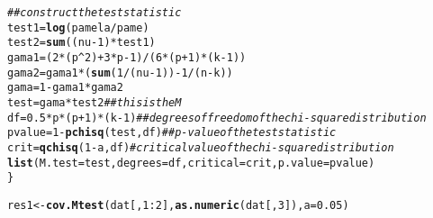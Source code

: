 \documentclass[a4paper,titlepage,12pt]{article}\usepackage[]{graphicx}\usepackage[]{color}
\makeatletter
\newcommand{\hlnum}[1]{\textcolor[rgb]{0.686,0.059,0.569}{#1}}%
\newcommand{\hlcom}[1]{\textcolor[rgb]{0.678,0.584,0.686}{\textit{#1}}}%
\newcommand{\hlopt}[1]{\textcolor[rgb]{0,0,0}{#1}}%
\newcommand{\hlstd}[1]{\textcolor[rgb]{0.345,0.345,0.345}{#1}}%
\newcommand{\hlkwb}[1]{\textcolor[rgb]{0.69,0.353,0.396}{#1}}%
\newcommand{\hlkwc}[1]{\textcolor[rgb]{0.333,0.667,0.333}{#1}}%
\newcommand{\hlkwd}[1]{\textcolor[rgb]{0.737,0.353,0.396}{\textbf{#1}}}%
\newenvironment{kframe}{%
 \def\at@end@of@kframe{}%
 \ifinner\ifhmode%
  \def\at@end@of@kframe{\end{minipage}}%
  \begin{minipage}{\columnwidth}%
 \fi\fi%
 \def\FrameCommand##1{\hskip\@totalleftmargin \hskip-\fboxsep
 \colorbox{shadecolor}{##1}\hskip-\fboxsep
     \hskip-\linewidth \hskip-\@totalleftmargin \hskip\columnwidth}%
 \MakeFramed {\advance\hsize-\width
   \@totalleftmargin\z@ \linewidth\hsize
   \@setminipage}}%
 {\par\unskip\endMakeFramed%
 \at@end@of@kframe}
\newenvironment{knitrout}{}{} %
\makeatother
\begin{document}
\begin{knitrout}
\begin{kframe}
\begin{alltt}
    \hlcom{## construct the test statistic}
    \hlstd{test1} \hlkwb{=} \hlkwd{log}\hlstd{(pamela}\hlopt{/}\hlstd{pame)}
    \hlstd{test2} \hlkwb{=} \hlkwd{sum}\hlstd{((nu} \hlopt{-} \hlnum{1}\hlstd{)} \hlopt{*} \hlstd{test1)}
    \hlstd{gama1} \hlkwb{=} \hlstd{(}\hlnum{2} \hlopt{*} \hlstd{(p}\hlopt{^}\hlnum{2}\hlstd{)} \hlopt{+} \hlnum{3} \hlopt{*} \hlstd{p} \hlopt{-} \hlnum{1}\hlstd{)}\hlopt{/}\hlstd{(}\hlnum{6} \hlopt{*} \hlstd{(p} \hlopt{+} \hlnum{1}\hlstd{)} \hlopt{*} \hlstd{(k} \hlopt{-} \hlnum{1}\hlstd{))}
    \hlstd{gama2} \hlkwb{=} \hlstd{gama1} \hlopt{*} \hlstd{(}\hlkwd{sum}\hlstd{(}\hlnum{1}\hlopt{/}\hlstd{(nu} \hlopt{-} \hlnum{1}\hlstd{))} \hlopt{-} \hlnum{1}\hlopt{/}\hlstd{(n} \hlopt{-} \hlstd{k))}
    \hlstd{gama} \hlkwb{=} \hlnum{1} \hlopt{-} \hlstd{gama1} \hlopt{*} \hlstd{gama2}
    \hlstd{test} \hlkwb{=} \hlstd{gama} \hlopt{*} \hlstd{test2}  \hlcom{## this is the M}
    \hlstd{df} \hlkwb{=} \hlnum{0.5} \hlopt{*} \hlstd{p} \hlopt{*} \hlstd{(p} \hlopt{+} \hlnum{1}\hlstd{)} \hlopt{*} \hlstd{(k} \hlopt{-} \hlnum{1}\hlstd{)}  \hlcom{## degrees of freedom of the chi-square distribution}
    \hlstd{pvalue} \hlkwb{=} \hlnum{1} \hlopt{-} \hlkwd{pchisq}\hlstd{(test, df)}  \hlcom{## p-value of the test statistic}
    \hlstd{crit} \hlkwb{=} \hlkwd{qchisq}\hlstd{(}\hlnum{1} \hlopt{-} \hlstd{a, df)}  \hlcom{#critical value of the chi-square distribution}
    \hlkwd{list}\hlstd{(}\hlkwc{M.test} \hlstd{= test,} \hlkwc{degrees} \hlstd{= df,} \hlkwc{critical} \hlstd{= crit,} \hlkwc{p.value} \hlstd{= pvalue)}
\hlstd{\}}


\hlstd{res1} \hlkwb{<-} \hlkwd{cov.Mtest}\hlstd{(dat[,} \hlnum{1}\hlopt{:}\hlnum{2}\hlstd{],} \hlkwd{as.numeric}\hlstd{(dat[,} \hlnum{3}\hlstd{]),} \hlkwc{a} \hlstd{=} \hlnum{0.05}\hlstd{)}
\end{alltt}
\end{kframe}
\end{knitrout}
\end{document}
